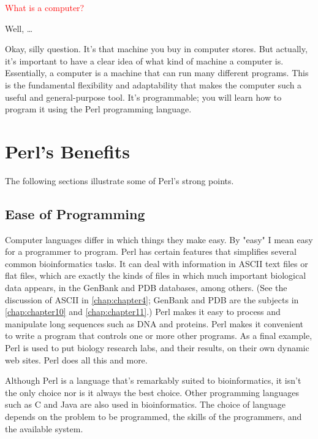 \textcolor{red}{What is a computer?}

\begin{adjustwidth}{2em}{}
Well, \ldots

Okay, silly question. It's that machine you buy in computer stores. But actually, it's important to have a clear idea of what kind of machine a computer is. Essentially, a computer is a machine that can run many different programs. This is the fundamental flexibility and adaptability that makes the computer such a useful and general-purpose tool. It's programmable; you will learn how to program it using the Perl programming language. 
\end{adjustwidth}

\section{Perl's Benefits}
The following sections illustrate some of Perl's strong points.

\subsection{Ease of Programming}
Computer languages differ in which things they make easy. By "easy" I mean easy for a programmer to program. Perl has certain features that simplifies several common bioinformatics tasks. It can deal with information in ASCII text files or flat files, which are exactly the kinds of files in which much important biological data appears, in the GenBank and PDB databases, among others. (See the discussion of ASCII in \autoref{chap:chapter4}; GenBank and PDB are the subjects in \autoref{chap:chapter10} and \autoref{chap:chapter11}.) Perl makes it easy to process and manipulate long sequences such as DNA and proteins. Perl makes it convenient to write a program that controls one or more other programs. As a final example, Perl is used to put biology research labs, and their results, on their own dynamic web sites. Perl does all this and more.

Although Perl is a language that's remarkably suited to bioinformatics, it isn't the only choice nor is it always the best choice. Other programming languages such as C and Java are also used in bioinformatics. The choice of language depends on the problem to be programmed, the skills of the programmers, and the available system.

